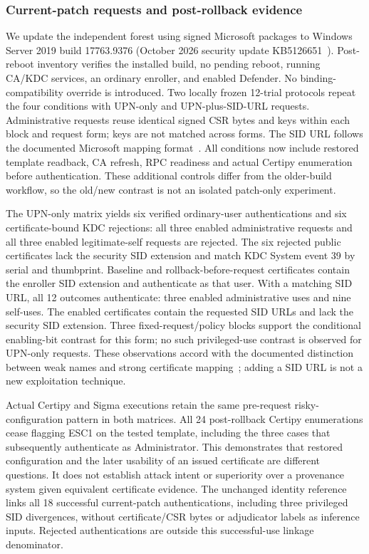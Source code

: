 \subsubsection{Current-patch requests and post-rollback evidence}
We update the independent forest using signed Microsoft packages to Windows Server 2019 build 17763.9376 (October 2026 security update KB5126651~\cite{microsoft2026october2019}). Post-reboot inventory verifies the installed build, no pending reboot, running CA/KDC services, an ordinary enroller, and enabled Defender. No binding-compatibility override is introduced. Two locally frozen 12-trial protocols repeat the four conditions with UPN-only and UPN-plus-SID-URL requests. Administrative requests reuse identical signed CSR bytes and keys within each block and request form; keys are not matched across forms. The SID URL follows the documented Microsoft mapping format~\cite{microsoft2025pkcasid}. All conditions now include restored template readback, CA refresh, RPC readiness and actual Certipy enumeration before authentication. These additional controls differ from the older-build workflow, so the old/new contrast is not an isolated patch-only experiment.



The UPN-only matrix yields six verified ordinary-user authentications and six certificate-bound KDC rejections: all three enabled administrative requests and all three enabled legitimate-self requests are rejected. The six rejected public certificates lack the security SID extension and match KDC System event 39 by serial and thumbprint. Baseline and rollback-before-request certificates contain the enroller SID extension and authenticate as that user. With a matching SID URL, all 12 outcomes authenticate: three enabled administrative uses and nine self-uses. The enabled certificates contain the requested SID URLs and lack the security SID extension. Three fixed-request/policy blocks support the conditional enabling-bit contrast for this form; no such privileged-use contrast is observed for UPN-only requests. These observations accord with the documented distinction between weak names and strong certificate mapping~\cite{microsoft2025strongbinding,microsoft2025pkcasid}; adding a SID URL is not a new exploitation technique.

Actual Certipy and Sigma executions retain the same pre-request risky-configuration pattern in both matrices. All 24 post-rollback Certipy enumerations cease flagging ESC1 on the tested template, including the three cases that subsequently authenticate as Administrator. This demonstrates that restored configuration and the later usability of an issued certificate are different questions. It does not establish attack intent or superiority over a provenance system given equivalent certificate evidence. The unchanged identity reference links all 18 successful current-patch authentications, including three privileged SID divergences, without certificate/CSR bytes or adjudicator labels as inference inputs. Rejected authentications are outside this successful-use linkage denominator.

